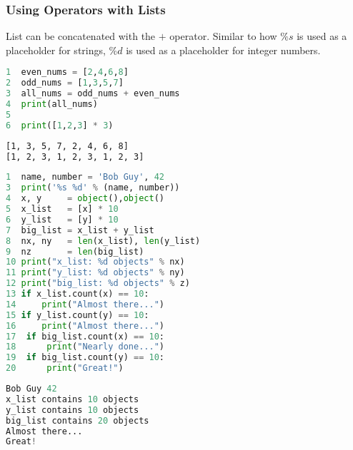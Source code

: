 \documentclass[crop=false,class=book]{standalone}
\begin{document}
\subsubsection{Using Operators with Lists}
List can be concatenated with the $+$ operator. Similar to how $\%s$ is used as a placeholder for strings, $\%d$ is used as a placeholder for integer numbers.\newline
\begin{minipage}[t]{.48\textwidth}
\centering
\begin{lstlisting}[language=python,frame=single,basicstyle=\footnotesize,frame=single,caption=input]
1  even_nums = [2,4,6,8]
2  odd_nums = [1,3,5,7]
3  all_nums = odd_nums + even_nums
4  print(all_nums)
5
6  print([1,2,3] * 3)
\end{lstlisting}
\end{minipage}\hfill
\begin{minipage}[t]{.48\textwidth}
\centering
\begin{lstlisting}[language=bash,basicstyle=\small\ttfamily,frame=single,caption=output]
[1, 3, 5, 7, 2, 4, 6, 8]
[1, 2, 3, 1, 2, 3, 1, 2, 3]
\end{lstlisting}
\end{minipage}
\begin{minipage}[t]{0.48\textwidth}
\begin{lstlisting}[language=python,frame=single,basicstyle=\footnotesize,frame=single,caption=input]
1  name, number = 'Bob Guy', 42
3  print('%s %d' % (name, number))
4  x, y     = object(),object()
5  x_list   = [x] * 10
6  y_list   = [y] * 10
7  big_list = x_list + y_list
8  nx, ny   = len(x_list), len(y_list)
9  nz       = len(big_list)
10 print("x_list: %d objects" % nx)
11 print("y_list: %d objects" % ny)
12 print("big_list: %d objects" % z)
13 if x_list.count(x) == 10:
14     print("Almost there...")
15 if y_list.count(y) == 10:
16     print("Almost there...")
17  if big_list.count(x) == 10:
18      print("Nearly done...")
19  if big_list.count(y) == 10:
20      print("Great!")
\end{lstlisting}
\end{minipage}\hfill
\begin{minipage}[t]{0.48\textwidth}
\begin{lstlisting}[language=python,frame=single,basicstyle=\footnotesize,frame=single,caption=output]
Bob Guy 42
x_list contains 10 objects
y_list contains 10 objects
big_list contains 20 objects
Almost there...
Great!
\end{lstlisting}
\end{minipage}
\clearpage
\end{document}
